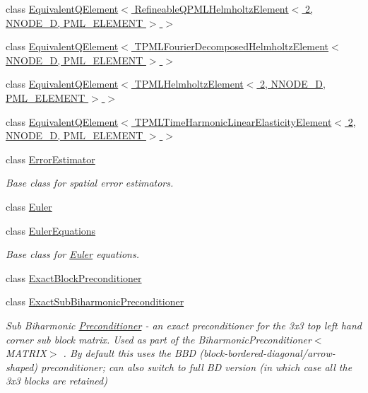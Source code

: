 \begin{DoxyCompactItemize}
\item 
class \hyperlink{classoomph_1_1EquivalentQElement_3_01RefineableQPMLHelmholtzElement_3_012_00_01NNODE__1D_00_01PML__ELEMENT_01_4_01_4}{Equivalent\+Q\+Element$<$ Refineable\+Q\+P\+M\+L\+Helmholtz\+Element$<$ 2, N\+N\+O\+D\+E\+\_\+D, P\+M\+L\+\_\+\+E\+L\+E\+M\+E\+N\+T $>$ $>$}
\item 
class \hyperlink{classoomph_1_1EquivalentQElement_3_01TPMLFourierDecomposedHelmholtzElement_3_01NNODE__1D_00_01PML__ELEMENT_01_4_01_4}{Equivalent\+Q\+Element$<$ T\+P\+M\+L\+Fourier\+Decomposed\+Helmholtz\+Element$<$ N\+N\+O\+D\+E\+\_\+D, P\+M\+L\+\_\+\+E\+L\+E\+M\+E\+N\+T $>$ $>$}
\item 
class \hyperlink{classoomph_1_1EquivalentQElement_3_01TPMLHelmholtzElement_3_012_00_01NNODE__1D_00_01PML__ELEMENT_01_4_01_4}{Equivalent\+Q\+Element$<$ T\+P\+M\+L\+Helmholtz\+Element$<$ 2, N\+N\+O\+D\+E\+\_\+D, P\+M\+L\+\_\+\+E\+L\+E\+M\+E\+N\+T $>$ $>$}
\item 
class \hyperlink{classoomph_1_1EquivalentQElement_3_01TPMLTimeHarmonicLinearElasticityElement_3_012_00_01NNODE__1D_00_01PML__ELEMENT_01_4_01_4}{Equivalent\+Q\+Element$<$ T\+P\+M\+L\+Time\+Harmonic\+Linear\+Elasticity\+Element$<$ 2, N\+N\+O\+D\+E\+\_\+D, P\+M\+L\+\_\+\+E\+L\+E\+M\+E\+N\+T $>$ $>$}
\item 
class \hyperlink{classoomph_1_1ErrorEstimator}{Error\+Estimator}
\begin{DoxyCompactList}\small\item\em Base class for spatial error estimators. \end{DoxyCompactList}\item 
class \hyperlink{classoomph_1_1Euler}{Euler}
\item 
class \hyperlink{classoomph_1_1EulerEquations}{Euler\+Equations}
\begin{DoxyCompactList}\small\item\em Base class for \hyperlink{classoomph_1_1Euler}{Euler} equations. \end{DoxyCompactList}\item 
class \hyperlink{classoomph_1_1ExactBlockPreconditioner}{Exact\+Block\+Preconditioner}
\item 
class \hyperlink{classoomph_1_1ExactSubBiharmonicPreconditioner}{Exact\+Sub\+Biharmonic\+Preconditioner}
\begin{DoxyCompactList}\small\item\em Sub Biharmonic \hyperlink{classoomph_1_1Preconditioner}{Preconditioner} -\/ an exact preconditioner for the 3x3 top left hand corner sub block matrix. Used as part of the Biharmonic\+Preconditioner$<$\+M\+A\+T\+R\+I\+X$>$ . By default this uses the B\+BD (block-\/bordered-\/diagonal/arrow-\/shaped) preconditioner; can also switch to full BD version (in which case all the 3x3 blocks are retained) \end{DoxyCompactList}\item 

\end{DoxyCompactItemize}
